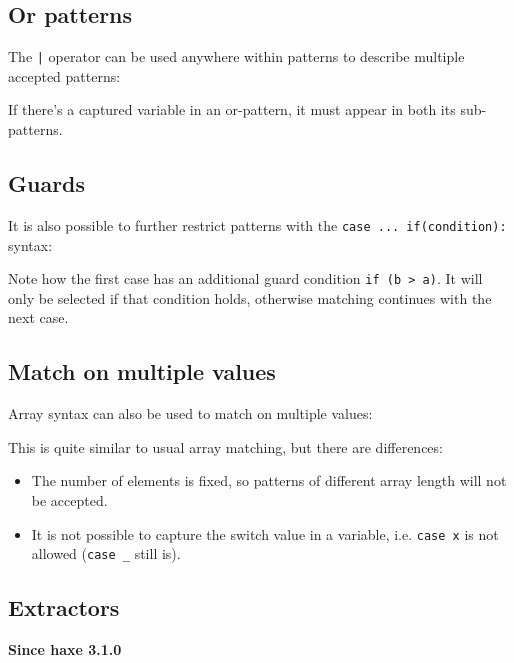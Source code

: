 \documentclass[a4paper,oneside]{book}
\newcommand{\expr}[1]{\texttt{#1}}
\newcommand{\since}[1]{\noindent\textbf{Since haxe #1}\\}
\newcommand{\haxe}[2][]{%
}
\begin{document}
\subsection{Or patterns}
\label{lf-pattern-matching-or}

The \expr{|} operator can be used anywhere within patterns to describe multiple accepted patterns:

\haxe[firstline=56,lastline=61]{assets/PatternMatching.hx}

If there's a captured variable in an or-pattern, it must appear in both its sub-patterns.

\subsection{Guards}
\label{lf-pattern-matching-guards}

It is also possible to further restrict patterns with the \expr{case ... if(condition):} syntax:

\haxe[firstline=64,lastline=72]{assets/PatternMatching.hx}

Note how the first case has an additional guard condition \expr{if (b > a)}. It will only be selected if that condition holds, otherwise matching continues with the next case.

\subsection{Match on multiple values}
\label{lf-pattern-matching-tuples}

Array syntax can also be used to match on multiple values:

\haxe[firstline=75,lastline=80]{assets/PatternMatching.hx}

This is quite similar to usual array matching, but there are differences:

\begin{itemize}
	\item The number of elements is fixed, so patterns of different array length will not be accepted.
	\item It is not possible to capture the switch value in a variable, i.e. \expr{case x} is not allowed (\expr{case _} still is).
\end{itemize}




\subsection{Extractors}
\label{lf-pattern-matching-extractors}
\since{3.1.0}
\end{document}
